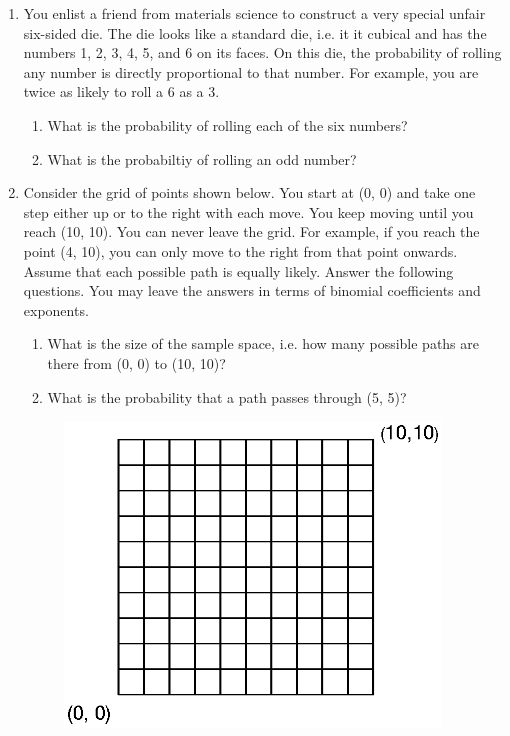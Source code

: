 \documentclass[12pt]{article}
\begin{document}
\begin{enumerate}
\item You enlist a friend from materials science to construct a very special unfair six-sided die. The die looks like a standard die, i.e. it it cubical and has the numbers 1, 2, 3, 4, 5, and 6 on its faces. On this die, the probability of rolling any number is directly proportional to that number. For example, you are twice as likely to roll a 6 as a 3. 
\begin{enumerate}
\item What is the probability of rolling each of the six numbers?
\item What is the probabiltiy of rolling an odd number?
\end{enumerate}

\item Consider the grid of points shown below. You start at (0, 0) and take one step either up or to the right with each move. You keep moving until you reach (10, 10). You can never leave the grid. For example, if you reach the point (4, 10), you can only move to the right from that point onwards. Assume that each possible path is equally likely. Answer the following questions. You may leave the answers in terms of binomial coefficients and exponents.
\begin{enumerate}
\item What is the size of the sample space, i.e. how many possible paths are there from (0, 0) to (10, 10)?
\item What is the probability that a path passes through (5, 5)?
\end{enumerate}
\begin{figure}[H]
\centering
\includegraphics[width=10cm]{grid.eps}
\end{figure}


\end{enumerate}
\end{document}
